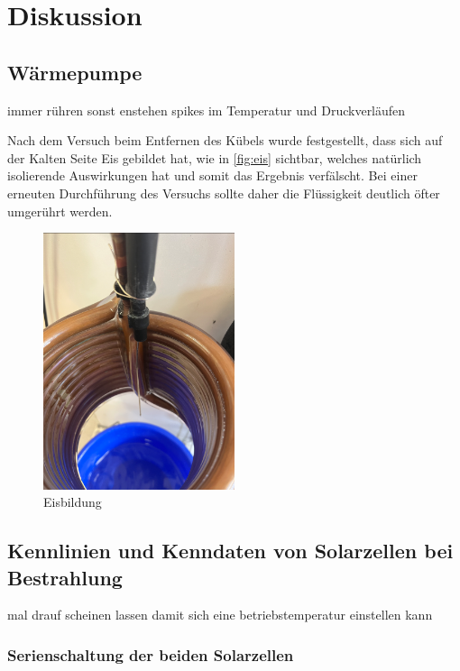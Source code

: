 \documentclass[12pt,english,ngerman]{scrartcl}
\begin{document}
\section{Diskussion}\label{sec:diskussion}

\subsection{Wärmepumpe}

immer rühren sonst enstehen spikes im Temperatur und Druckverläufen

Nach dem Versuch beim Entfernen des Kübels wurde festgestellt, dass sich auf
der Kalten Seite Eis gebildet hat, wie in \autoref{fig:eis} sichtbar, welches
natürlich isolierende Auswirkungen hat und somit das Ergebnis verfälscht. Bei
einer erneuten Durchführung des Versuchs sollte daher die Flüssigkeit deutlich
öfter umgerührt werden.

\begin{figure}[H]
	\centering
	\includegraphics[width=0.5\textwidth]{figures/eis.PNG}
	\caption{Eisbildung
	}\label{fig:eis}
\end{figure}

\subsection{Kennlinien und Kenndaten von Solarzellen bei Bestrahlung}

mal drauf scheinen lassen damit sich eine betriebstemperatur einstellen kann

\subsubsection{Serienschaltung der beiden Solarzellen}
\end{document}
